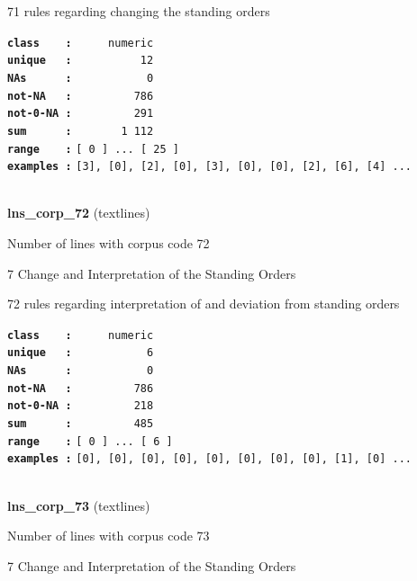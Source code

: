 \documentclass[]{article}
\begin{document}
71 rules regarding changing the standing orders

\textbf{\texttt{class\ \ \ \ :}} \texttt{~~~~~numeric}\\
\textbf{\texttt{unique\ \ \ :}} \texttt{~~~~~~~~~~12}\\
\textbf{\texttt{NAs\ \ \ \ \ \ :}} \texttt{~~~~~~~~~~~0}\\
\textbf{\texttt{not-NA\ \ \ :}} \texttt{~~~~~~~~~786}\\
\textbf{\texttt{not-0-NA\ :}} \texttt{~~~~~~~~~291}\\
\textbf{\texttt{sum\ \ \ \ \ \ :}} \texttt{~~~~~~~1~112}\\
\textbf{\texttt{range\ \ \ \ :}}
\texttt{{[}\ 0\ {]}\ ...\ {[}\ 25\ {]}}\\
\textbf{\texttt{examples\ :}}
\texttt{{[}3{]},\ {[}0{]},\ {[}2{]},\ {[}0{]},\ {[}3{]},\ {[}0{]},\ {[}0{]},\ {[}2{]},\ {[}6{]},\ {[}4{]}\ ...}\\

~

\textbf{lns\_corp\_72} (textlines)

Number of lines with corpus code 72

7 Change and Interpretation of the Standing Orders

72 rules regarding interpretation of and deviation from standing orders

\textbf{\texttt{class\ \ \ \ :}} \texttt{~~~~~numeric}\\
\textbf{\texttt{unique\ \ \ :}} \texttt{~~~~~~~~~~~6}\\
\textbf{\texttt{NAs\ \ \ \ \ \ :}} \texttt{~~~~~~~~~~~0}\\
\textbf{\texttt{not-NA\ \ \ :}} \texttt{~~~~~~~~~786}\\
\textbf{\texttt{not-0-NA\ :}} \texttt{~~~~~~~~~218}\\
\textbf{\texttt{sum\ \ \ \ \ \ :}} \texttt{~~~~~~~~~485}\\
\textbf{\texttt{range\ \ \ \ :}}
\texttt{{[}\ 0\ {]}\ ...\ {[}\ 6\ {]}}\\
\textbf{\texttt{examples\ :}}
\texttt{{[}0{]},\ {[}0{]},\ {[}0{]},\ {[}0{]},\ {[}0{]},\ {[}0{]},\ {[}0{]},\ {[}0{]},\ {[}1{]},\ {[}0{]}\ ...}\\

~

\textbf{lns\_corp\_73} (textlines)

Number of lines with corpus code 73

7 Change and Interpretation of the Standing Orders
\end{document}
